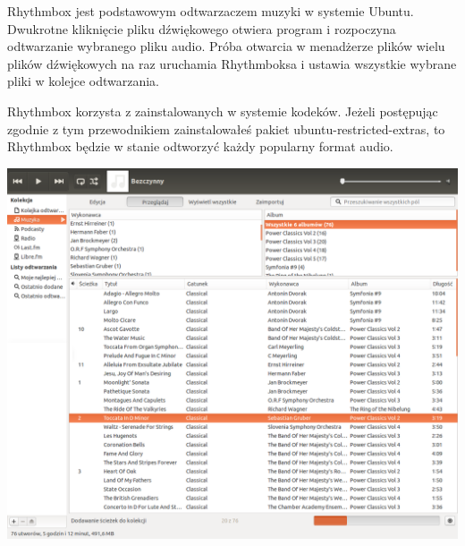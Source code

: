 Rhythmbox jest podstawowym odtwarzaczem muzyki w systemie Ubuntu. Dwukrotne kliknięcie pliku dźwiękowego otwiera program i rozpoczyna odtwarzanie wybranego pliku audio. Próba otwarcia w menadżerze plików wielu plików dźwiękowych na raz uruchamia Rhythmboksa i ustawia wszystkie wybrane pliki w kolejce odtwarzania.

Rhythmbox korzysta z zainstalowanych w systemie kodeków. Jeżeli postępując zgodnie z tym przewodnikiem zainstalowałeś pakiet \textcolor{ubuntu_orange}{ubuntu-restricted-extras}, to Rhythmbox będzie w stanie odtworzyć każdy popularny format audio.
\begin{center}
	\includegraphics[width=\linewidth]{images/programy_rhythmbox1.png}
\end{center}

